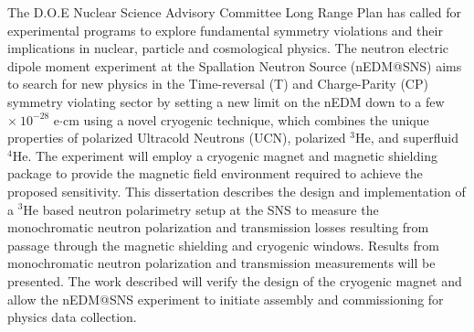 The D.O.E Nuclear Science Advisory Committee Long Range Plan has called for experimental programs to explore fundamental symmetry violations and their implications in nuclear, particle and cosmological physics. The neutron electric dipole moment experiment at the Spallation Neutron Source (nEDM@SNS) aims to search for new physics in the Time-reversal (T) and Charge-Parity (CP) symmetry violating sector by setting a new limit on the nEDM down to a few $\times~10^{-28}$ e$\cdot$cm using a novel cryogenic technique, which combines the unique properties of polarized Ultracold Neutrons (UCN), polarized $^3$He, and superfluid $^4$He. The experiment will employ a cryogenic magnet and magnetic shielding package to provide the magnetic field environment required to achieve the proposed sensitivity. This dissertation describes the design and implementation of a $^3$He based neutron polarimetry setup at the SNS to measure the monochromatic neutron polarization and transmission losses resulting from passage through the magnetic shielding and cryogenic windows. Results from monochromatic neutron polarization and transmission measurements will be presented. The work described will verify the design of the cryogenic magnet and allow the nEDM@SNS experiment to initiate assembly and commissioning for physics data collection.